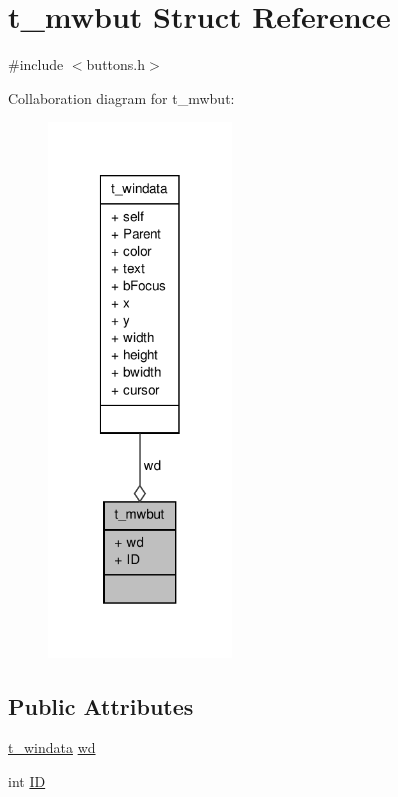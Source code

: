 \hypertarget{structt__mwbut}{\section{t\-\_\-mwbut \-Struct \-Reference}
\label{structt__mwbut}
}


{\ttfamily \#include $<$buttons.\-h$>$}



\-Collaboration diagram for t\-\_\-mwbut\-:
\nopagebreak
\begin{figure}[H]
\begin{center}
\leavevmode
\includegraphics[width=138pt]{structt__mwbut__coll__graph}
\end{center}
\end{figure}
\subsection*{\-Public \-Attributes}
\begin{DoxyCompactItemize}
\item 
\hyperlink{structt__windata}{t\-\_\-windata} \hyperlink{structt__mwbut_aa425915f09964bba45283d1e9647c29f}{wd}
\item 
int \hyperlink{structt__mwbut_a900392e24406775d7e2b9de79f8a3bc9}{\-I\-D}
\end{DoxyCompactItemize}


